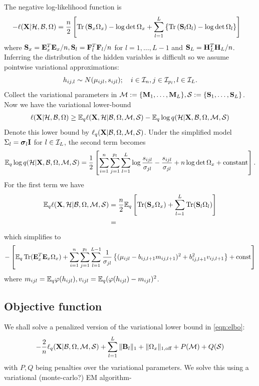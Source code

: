 \documentclass[11pt,letterpaper]{article}
\DeclareMathOperator*{\Tr}{Tr}
\numberwithin{equation}{section}
\begin{document}
The negative log-likelihood function is
%
\begin{align*}
-\ell( \bfX| \cH, \cB, \Omega) &= \frac{n}{2}\left[ \Tr \left(\bfS_x \Omega_x \right) - \log \det \Omega_x +
\sum_{l=1}^L \left\{ \Tr \left(\bfS_l \Omega_l \right) - \log \det \Omega_l \right\} \right]
\end{align*}
%
where ${\mathbf{S}}_x = {\mathbf{E}}_x^T {\mathbf{E}}_x/n, {\mathbf{S}}_l = {\mathbf{F}}_l^T {\mathbf{F}}_l/n$ for $l = 1, \ldots, L-1$ and ${\mathbf{S}}_L = {\mathbf{H}}_L^T {\mathbf{H}}_L/n$.
%
Inferring the distribution of the hidden variables is difficult so we assume pointwise variational approximations:
%
$$ h_{ij,l} \sim N(\mu_{ijl}, s_{ijl}); \quad i \in {\cal{I}}_n, j \in {\cal{I}}_{p_l}, l \in {\cal{I}}_L. $$
%
Collect the variational parameters in ${\cal{M}} := \{ {\mathbf{M}}_1, \ldots, {\mathbf{M}}_L\}, {\cal{S}}:= \{ {\mathbf{S}}_1, \ldots, {\mathbf{S}}_L\}$. Now we have the variational lower-bound
%
\begin{align}\label{eqn:elbo}
\ell( {\mathbf{X}}| {\cal{H}}, {\cal{B}}, \Omega) \geq
{\mathbb{E}}_q \ell ({\mathbf{X}},{\cal{H}}| {\cal{B}},\Omega,{\cal{M}},{\cal{S}}) - {\mathbb{E}}_q \log q({\cal{H}}| {\mathbf{X}}, {\cal{B}},\Omega,{\cal{M}},{\cal{S}})
\end{align}
%
Denote this lower bound by $\ell_q({\mathbf{X}}|{\cal{B}},\Omega,{\cal{M}},{\cal{S}})$. Under the simplified model $\Sigma_l = {\boldsymbol{\sigma}}_l {\mathbf{I}}$ for $l \in {\cal{I}}_L$, the second term becomes \citep{FreyHinton99}
%
\begin{align}\label{eqn:KLdivergence}
{\mathbb{E}}_q \log q({\cal{H}}| {\mathbf{X}}, {\cal{B}},\Omega,{\cal{M}},{\cal{S}}) = \frac{1}{2} \left[\sum_{i=1}^n \sum_{j=1}^{p_l} \sum_{l=1}^L \log \frac{s_{ijl}}{\sigma_{jl}} -\frac{s_{ijl}}{\sigma_{jl}} + n \log \det \Omega_x + \text{constant} \right].
\end{align}
%
For the first term we have
%
\begin{align*}
\BE_q \ell (\bfX,\cH| \cB,\Omega,\cM,\cS) &=
\frac{n}{2} \BE_q \left[ \Tr ( \bfS_x \Omega_x) + \sum_{l=1}^L \Tr(\bfS_l \Omega_l) \right]\\
&= 
\end{align*}
%
which simplifies to \citep{FreyHinton99}
%
\begin{align}\label{eqn:loglik}
- \left[ \BE_q \Tr(\bfE_x^T \bfE_x \Omega_x)  +
\sum_{i=1}^n \sum_{j=1}^{p_l} \sum_{l=1}^{L-1}
\frac{1}{\sigma_{jl}} \left\{ (\mu_{ijl} - b_{ij,l+1} m_{ij,l+1})^2 + b_{ij,l+1}^2 v_{ij,l+1} \right\} + \text{const} \right]
\end{align}
%
where $m_{ijl} = {\mathbb{E}}_q \varphi( h_{ijl}), v_{ijl} = {\mathbb{E}}_q (\varphi( h_{ijl}) - m_{ijl})^2$.

\subsection{Objective function}
We shall solve a penalized version of the variational lower bound in \eqref{eqn:elbo}:
%
\begin{align*}
-\frac{2}{n} \ell_q({\mathbf{X}}|{\cal{B}},\Omega,{\cal{M}},{\cal{S}}) + \sum_{l=1}^L \| {\mathbf{B}}_l\|_1 + \| \Omega_x \|_{1,\text{off}} +
P({\cal{M}}) + Q({\cal{S}})
\end{align*}
%
with $P,Q$ being penalties over the variational parameters. We solve this using a variational (monte-carlo?) EM algorithm-
\end{document}
